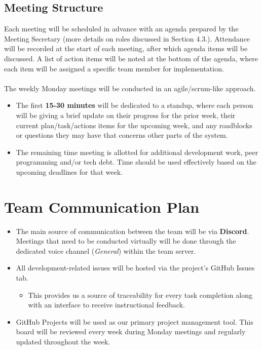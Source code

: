 \documentclass{article}
\begin{document}
\subsection{Meeting Structure}
Each meeting will be scheduled in advance with an agenda prepared by the Meeting
Secretary (more details on roles discussed in Section 4.3.). Attendance will be
recorded at the start of each meeting, after which agenda items will be
discussed. A list of action items will be noted at the bottom of the agenda,
where each item will be assigned a specific team member for implementation. \\
\\
The weekly Monday meetings will be conducted in an agile/scrum-like approach. 
\begin{itemize}
    \item The first \textbf{15-30 minutes} will be dedicated to a standup, where
    each person will be giving a brief update on their progress for the prior
    week, their current plan/task/actions items for the upcoming week, and any
    roadblocks or questions they may have that concerns other parts of the
    system.
    \item The remaining time meeting is allotted for additional development
    work, peer programming and/or tech debt. Time should be used effectively
    based on the upcoming deadlines for that week.
\end{itemize}

\newpage

\section{Team Communication Plan}

\begin{itemize}
    \item The main source of communication between the team will be via
    \textbf{Discord}. Meetings that need to be conducted virtually will be done
    through the dedicated voice channel (\textit{General}) within the team
    server.
    
    \item All development-related issues will be hosted via the project’s GitHub
    Issues tab.
    \begin{itemize}
        \item This provides us a source of traceability for every task
        completion along with an interface to receive instructional feedback.
    \end{itemize}

    \item GitHub Projects will be used as our primary project management tool.
    This board will be reviewed every week during Monday meetings and regularly
    updated throughout the week.
\end{itemize}
\end{document}
